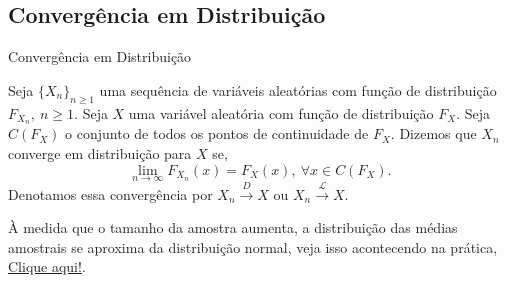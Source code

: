 \documentclass[12pt]{beamer}
\begin{document}
\subsection{Convergência em Distribuição}
\begin{frame}{Convergência em Distribuição}
\begin{definicao}
\justifying
Seja $\{X_{n}\}_{n\geq 1}$ uma sequência de variáveis aleatórias com função de distribuição $F_{X_{n}},~n\geq 1.$ Seja $X$ uma variável aleatória com função de distribuição $F_{X}.$ Seja $C(F_{X})$ o conjunto de todos os pontos de continuidade de $F_{X}$. Dizemos que $X_{n}$ converge em distribuição para $X$ se,
$$\lim_{{n \to \infty}} F_{X_{n}}(x) = F_X(x), ~\forall x \in C(F_X).$$ Denotamos essa convergência por $X_{n} \overset{D}{\rightarrow} X$ ou $X_{n} \overset{\mathcal{L}}{\rightarrow} X.$
\end{definicao}
\pause
\begin{block}{}
	À medida que o tamanho da amostra aumenta, a distribuição das médias amostrais se aproxima da distribuição normal, veja isso acontecendo na prática, \href{https://est711.shinyapps.io/ConvergenciaProbabilidade/}{Clique aqui!}.
\end{block}

\end{frame}
\end{document}
